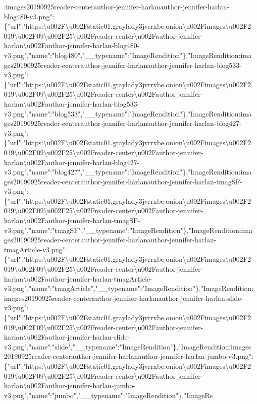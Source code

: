:images20190925reader-centerauthor-jennifer-harlanauthor-jennifer-harlan-blog480-v3.png":\{"url":"https:\textbackslash{}u002F\textbackslash{}u002Fstatic01.graylady3jvrrxbe.onion\textbackslash{}u002Fimages\textbackslash{}u002F2019\textbackslash{}u002F09\textbackslash{}u002F25\textbackslash{}u002Freader-center\textbackslash{}u002Fauthor-jennifer-harlan\textbackslash{}u002Fauthor-jennifer-harlan-blog480-v3.png","name":"blog480","\_\_typename":"ImageRendition"\},"ImageRendition:images20190925reader-centerauthor-jennifer-harlanauthor-jennifer-harlan-blog533-v3.png":\{"url":"https:\textbackslash{}u002F\textbackslash{}u002Fstatic01.graylady3jvrrxbe.onion\textbackslash{}u002Fimages\textbackslash{}u002F2019\textbackslash{}u002F09\textbackslash{}u002F25\textbackslash{}u002Freader-center\textbackslash{}u002Fauthor-jennifer-harlan\textbackslash{}u002Fauthor-jennifer-harlan-blog533-v3.png","name":"blog533","\_\_typename":"ImageRendition"\},"ImageRendition:images20190925reader-centerauthor-jennifer-harlanauthor-jennifer-harlan-blog427-v3.png":\{"url":"https:\textbackslash{}u002F\textbackslash{}u002Fstatic01.graylady3jvrrxbe.onion\textbackslash{}u002Fimages\textbackslash{}u002F2019\textbackslash{}u002F09\textbackslash{}u002F25\textbackslash{}u002Freader-center\textbackslash{}u002Fauthor-jennifer-harlan\textbackslash{}u002Fauthor-jennifer-harlan-blog427-v3.png","name":"blog427","\_\_typename":"ImageRendition"\},"ImageRendition:images20190925reader-centerauthor-jennifer-harlanauthor-jennifer-harlan-tmagSF-v3.png":\{"url":"https:\textbackslash{}u002F\textbackslash{}u002Fstatic01.graylady3jvrrxbe.onion\textbackslash{}u002Fimages\textbackslash{}u002F2019\textbackslash{}u002F09\textbackslash{}u002F25\textbackslash{}u002Freader-center\textbackslash{}u002Fauthor-jennifer-harlan\textbackslash{}u002Fauthor-jennifer-harlan-tmagSF-v3.png","name":"tmagSF","\_\_typename":"ImageRendition"\},"ImageRendition:images20190925reader-centerauthor-jennifer-harlanauthor-jennifer-harlan-tmagArticle-v3.png":\{"url":"https:\textbackslash{}u002F\textbackslash{}u002Fstatic01.graylady3jvrrxbe.onion\textbackslash{}u002Fimages\textbackslash{}u002F2019\textbackslash{}u002F09\textbackslash{}u002F25\textbackslash{}u002Freader-center\textbackslash{}u002Fauthor-jennifer-harlan\textbackslash{}u002Fauthor-jennifer-harlan-tmagArticle-v3.png","name":"tmagArticle","\_\_typename":"ImageRendition"\},"ImageRendition:images20190925reader-centerauthor-jennifer-harlanauthor-jennifer-harlan-slide-v3.png":\{"url":"https:\textbackslash{}u002F\textbackslash{}u002Fstatic01.graylady3jvrrxbe.onion\textbackslash{}u002Fimages\textbackslash{}u002F2019\textbackslash{}u002F09\textbackslash{}u002F25\textbackslash{}u002Freader-center\textbackslash{}u002Fauthor-jennifer-harlan\textbackslash{}u002Fauthor-jennifer-harlan-slide-v3.png","name":"slide","\_\_typename":"ImageRendition"\},"ImageRendition:images20190925reader-centerauthor-jennifer-harlanauthor-jennifer-harlan-jumbo-v3.png":\{"url":"https:\textbackslash{}u002F\textbackslash{}u002Fstatic01.graylady3jvrrxbe.onion\textbackslash{}u002Fimages\textbackslash{}u002F2019\textbackslash{}u002F09\textbackslash{}u002F25\textbackslash{}u002Freader-center\textbackslash{}u002Fauthor-jennifer-harlan\textbackslash{}u002Fauthor-jennifer-harlan-jumbo-v3.png","name":"jumbo","\_\_typename":"ImageRendition"\},"ImageRe